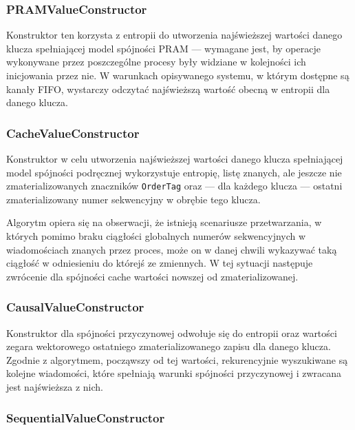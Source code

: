 \subsubsection{PRAMValueConstructor} \label{subsubsection:pramvalueconstructor}

Konstruktor ten korzysta z entropii do utworzenia najświeższej wartości danego klucza spełniającej model spójności PRAM --- wymagane jest, by operacje wykonywane przez poszczególne procesy były widziane w kolejności ich inicjowania przez nie. W warunkach opisywanego systemu, w którym dostępne są kanały FIFO, wystarczy odczytać najświeższą wartość obecną w entropii dla danego klucza.

\subsubsection{CacheValueConstructor} \label{subsubsection:cachevalueconstructor}

Konstruktor w celu utworzenia najświeższej wartości danego klucza spełniającej model spójności podręcznej wykorzystuje entropię, listę znanych, ale jeszcze nie zmaterializowanych znaczników \texttt{OrderTag} oraz --- dla każdego klucza --- ostatni zmaterializowany numer sekwencyjny w obrębie tego klucza.

Algorytm opiera się na obserwacji, że istnieją scenariusze przetwarzania, w których pomimo braku ciągłości globalnych numerów sekwencyjnych w wiadomościach znanych przez proces, może on w danej chwili wykazywać taką ciągłość w odniesieniu do którejś ze zmiennych. W tej sytuacji następuje zwrócenie dla spójności cache wartości nowszej od zmaterializowanej.

\subsubsection{CausalValueConstructor} \label{subsubsection:causalvalueconstructor}

Konstruktor dla spójności przyczynowej odwołuje się do entropii oraz wartości zegara wektorowego ostatniego zmaterializowanego zapisu dla danego klucza. Zgodnie z algorytmem, począwszy od tej wartości, rekurencyjnie wyszukiwane są kolejne wiadomości, które spełniają warunki spójności przyczynowej i zwracana jest najświeższa z nich.

\subsubsection{SequentialValueConstructor} \label{subsubsection:sequentialvalueconstructor}

